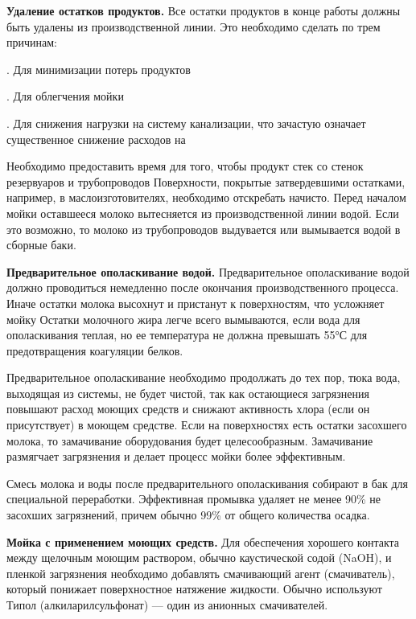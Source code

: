 {\par \redline \textbf{Удаление остатков продуктов.} Все остатки продуктов в конце работы должны быть удалены из производственной линии.
Это необходимо сделать по трем причинам:

\par {}. Для минимизации потерь продуктов
\par {}. Для облегчения мойки
\par {}. Для снижения нагрузки на систему канализации, что зачастую означает существенное снижение расходов на 

\par \redline Необходимо предоставить время для того, чтобы продукт стек со стенок резервуаров и трубопроводов Поверхности, покрытые затвердевшими остатками, например, в маслоизготовителях, необходимо отскребать начисто. Перед началом мойки оставшееся молоко вытесняется из производственной линии водой. Если это возможно, то молоко из трубопроводов выдувается или вымывается водой в сборные баки.


\par \redline \textbf{Предварительное ополаскивание водой.} Предварительное ополаскивание водой должно проводиться немедленно после окончания производственного процесса. Иначе остатки молока высохнут и пристанут к поверхностям, что усложняет мойку Остатки молочного жира легче всего вымываются, если вода для ополаскивания теплая, но ее температура не должна превышать 55°С для предотвращения коагуляции белков.

\par \redline Предварительное ополаскивание необходимо продолжать до тех пор, тюка вода, выходящая из системы, не будет чистой, так как остающиеся загрязнения повышают расход моющих средств и снижают активность хлора (если он присутствует) в моющем средстве. Если на поверхностях есть остатки засохшего молока, то замачивание оборудования будет целесообразным. Замачивание размягчает загрязнения и делает процесс мойки более эффективным.

\par \redline Смесь молока и воды после предварительного ополаскивания собирают в бак для специальной переработки. Эффективная промывка удаляет не менее 90\% не засохших загрязнений, причем обычно 99\% от общего количества осадка.

\par \redline \textbf{Мойка с применением моющих средств.} Для обеспечения хорошего контакта между щелочным моющим раствором, обычно каустической содой (NaOH), и пленкой загрязнения необходимо добавлять смачивающий агент (смачиватель), который понижает поверхностное натяжение жидкости. Обычно используют Типол (алкиларилсульфонат) — один из анионных смачивателей.

}
